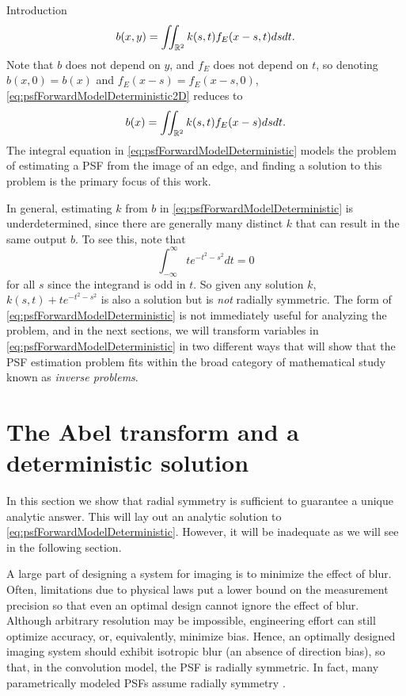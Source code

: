 \begin{chapter}{Introduction}
\begin{equation}
  b(x,y) = \iint_{\mathbb R^2} k(s,t) f_E(x-s,t)dsdt. 
\end{equation}
  Note that $b$ does not depend on $y$, and $f_E$ does not depend on $t$, so denoting $b(x,0) = b(x)$ and $f_E(x-s)=f_E(x-s,0)$, \eqref{eq:psfForwardModelDeterministic2D} reduces to
\begin{equation}\label{eq:psfForwardModelDeterministic}
  b(x) = \iint_{\mathbb R^2} k(s,t) f_E(x-s)dsdt. 
\end{equation} 
  The integral equation in \eqref{eq:psfForwardModelDeterministic} models the problem of estimating a PSF from the image of an edge, and finding a solution to this problem is the primary focus of this work.

  In general, estimating $k$ from $b$ in \eqref{eq:psfForwardModelDeterministic} is underdetermined, since there are generally many distinct $k$ that can result in the same output $b$.
  To see this, note that 
  \begin{equation}
    \int_{-\infty}^{\infty} te^{-t^2 - s^2}dt = 0
  \end{equation}
  for all $s$ since the integrand is odd in $t$.
  So given any solution $k$, $k(s,t)+te^{-t^2 - s^2}$ is also a solution but is \emph{not} radially symmetric.
  The form of \eqref{eq:psfForwardModelDeterministic} is not immediately useful for analyzing the problem, and in the next sections, we will transform variables in \eqref{eq:psfForwardModelDeterministic} in two different ways that will show that the PSF estimation problem fits within the broad category of mathematical study known as \emph{inverse problems}.
  
\section{The Abel transform and a deterministic solution}
  In this section we show that radial symmetry is sufficient to guarantee a unique analytic answer.
  This will lay out an analytic solution to \eqref{eq:psfForwardModelDeterministic}. 
  However, it will be inadequate as we will see in the following section.

  A large part of designing a system for imaging is to minimize the effect of blur.
  Often, limitations due to physical laws put a lower bound on the measurement precision so that even an optimal design cannot ignore the effect of blur.
  Although arbitrary resolution may be impossible, engineering effort can still optimize accuracy, or, equivalently, minimize bias.
  Hence, an optimally designed imaging system should exhibit isotropic blur (an absence of direction bias), so that, in the convolution model, the PSF is radially symmetric.
  In fact, many parametrically modeled PSFs assume radially symmetry \citep{doering1992,jain1989,kundur1996blind,watson1993}.  


\end{chapter}
